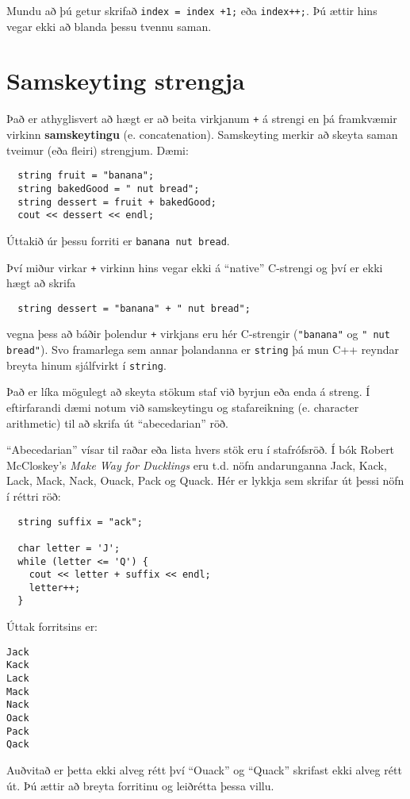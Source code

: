 Mundu að þú getur skrifað {\tt index = index +1;} eða {\tt index++;}.
Þú ættir hins vegar ekki að blanda þessu tvennu saman.

\section{Samskeyting strengja}

Það er athyglisvert að hægt er að beita virkjanum {\tt +} á strengi en þá framkvæmir virkinn {\bf samskeytingu} (e. concatenation).
Samskeyting merkir að skeyta saman tveimur (eða fleiri) strengjum.
Dæmi:

\begin{verbatim}
  string fruit = "banana";
  string bakedGood = " nut bread";
  string dessert = fruit + bakedGood;
  cout << dessert << endl;
\end{verbatim}
%
Úttakið úr þessu forriti er {\tt banana nut bread}.

Því miður virkar {\tt +} virkinn hins vegar ekki á ``native'' C-strengi og því er ekki hægt að skrifa

\begin{verbatim}
  string dessert = "banana" + " nut bread";
\end{verbatim}
%
vegna þess að báðir þolendur {\tt +} virkjans eru hér C-strengir (\verb+"banana"+ og \verb+" nut bread"+).
Svo framarlega sem annar þolandanna er {\tt string} þá mun C++ reyndar breyta hinum sjálfvirkt í {\tt string}.

Það er líka mögulegt að skeyta stökum staf við byrjun eða enda á streng.
Í eftirfarandi dæmi notum við samskeytingu og stafareikning (e. character arithmetic) til að skrifa út ``abecedarian'' röð.

``Abecedarian'' vísar til raðar eða lista hvers stök eru í stafrófsröð.
Í bók Robert McCloskey's {\em Make Way for Ducklings} eru t.d. nöfn andarunganna Jack,
Kack, Lack, Mack, Nack, Ouack, Pack og Quack.
Hér er lykkja sem skrifar út þessi nöfn í réttri röð: 

\begin{verbatim}
  string suffix = "ack";

  char letter = 'J';
  while (letter <= 'Q') {
    cout << letter + suffix << endl;
    letter++;
  }
\end{verbatim}
%
Úttak forritsins er:

\begin{verbatim}
Jack
Kack
Lack
Mack
Nack
Oack
Pack
Qack
\end{verbatim}
%
Auðvitað er þetta ekki alveg rétt því ``Ouack'' og ``Quack'' skrifast ekki alveg rétt út.
Þú ættir að breyta forritinu og leiðrétta þessa villu.

